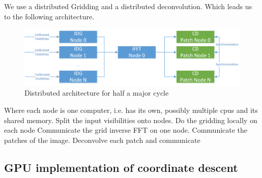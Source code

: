 We use a distributed Gridding and a distributed deconvolution. Which leads us to the following architecture.

\begin{figure}[h]
	\centering
	\includegraphics[width=0.80\linewidth]{./chapters/03.distribution/distributed_architecture.png}
	\caption{Distributed architecture for half a major cycle}
	\label{dist:architecture:fig}
\end{figure}

Where each node is one computer, i.e. has its own, possibly multiple cpus and its shared memory.
Split the input visibilities onto nodes. 
Do the gridding locally on each node
Communicate the grid
inverse FFT on one node.
Communicate the patches of the image.
Deconvolve each patch and communicate

\subsection{GPU implementation of coordinate descent}

